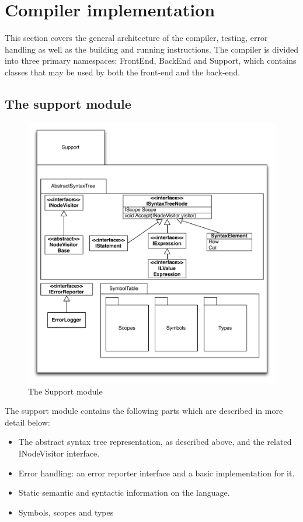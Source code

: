 \documentclass[a4paper,11pt]{article}
\begin{document}
\newpage
\section{Compiler implementation}

This section covers the general architecture of the compiler, testing, error handling as well as the building and running instructions. The compiler is divided into three primary namespaces: FrontEnd, BackEnd and Support, which contains classes that may be used by both the front-end and the back-end.

\subsection{The support module} \label{support}

\begin{figure}[h!]
\centering
\includegraphics[width=1.0\textwidth]{support.pdf}
\caption{The Support module}
\end{figure}

The support module contains the following parts which are described in more detail below:
\begin{itemize}
\item The abstract syntax tree representation, as described above, and the related INodeVisitor interface.
\item Error handling: an error reporter interface and a basic implementation for it.
\item Static semantic and syntactic information on the language.
\item Symbols, scopes and types
\end{itemize}
\end{document}

